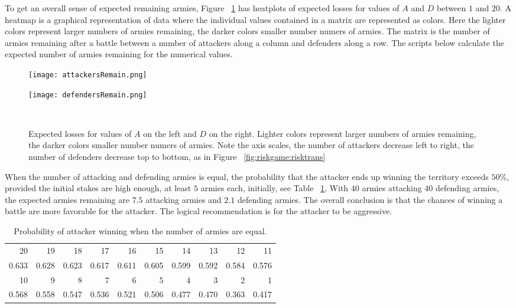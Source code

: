 \documentclass[12pt]{article}
\begin{document}
To get an overall sense of expected remaining armies, Figure~%
\ref{fig:riskgame:expectedrem} has heatplots of expected losses for
values of \( A \) and \( D \) between \( 1 \) and \( 20 \).  A heatmap
is a graphical representation of data where the individual values
contained in a matrix are represented as colors.  Here the lighter
colors represent larger numbers of armies remaining, the darker colors
smaller number numers of armies.  The matrix is the number of armies
remaining after a battle between a number of attackers along a column
and defenders along a row.  The scripts below calculate the expected
number of armies remaining for the numerical values.
\begin{figure}
    \centering
    \begin{minipage}[b]
        {0.40\linewidth} \texttt{[image: attackersRemain.png]}
    \end{minipage}
    \begin{minipage}[b]
        {0.40\linewidth} \texttt{[image: defendersRemain.png]}
    \end{minipage}
    \caption{Expected losses for values of \( A \) on the left and \( D \)
    on the right.  Lighter colors represent larger numbers of armies
    remaining, the darker colors smaller number numers of armies.  Note
    the axis scales, the number of attackers decrease left to right, the
    number of defenders decrease top to bottom, as in Figure~%
    \ref{fig:riskgame:risktrans}}~%
    \label{fig:riskgame:expectedrem}
\end{figure}

When the number of attacking and defending armies is equal, the
probability that the attacker ends up winning the territory exceeds \(
50\% \), provided the initial stakes are high enough, at least \( 5 \)
armies each, initially, see Table~%
\ref{tab:riskgame:equalwins}, With \( 40 \) armies attacking \( 40 \)
defending armies, the expected armies remaining are \( 7.5 \) attacking
armies and \( 2.1 \) defending armies.  The overall conclusion is that
the chances of winning a battle are more favorable for the attacker.
The logical recommendation is for the attacker to be aggressive.

\begin{table}
    \centering
    \begin{tabular}{rrrrrrrrrr}
        20     & 19       & 18          & 17           & 16          & 15      & 14         & 13    & 12    & 11    \\ 
        0.633  & 0.628    & 0.623       & 0.617        & 0.611       & 0.605   & 0.599      & 0.592 & 0.584 & 0.576 \\ 
        10     & 9        & 8           & 7            & 6           & 5       & 4          & 3     & 2     & 1     \\ 
        0.568  & 0.558    & 0.547       & 0.536        & 0.521       & 0.506   & 0.477      & 0.470 & 0.363 & 0.417
    \end{tabular}
    \caption{Probability of attacker winning when the number of armies
    are equal.}%
    \label{tab:riskgame:equalwins}
\end{table}
\end{document}
